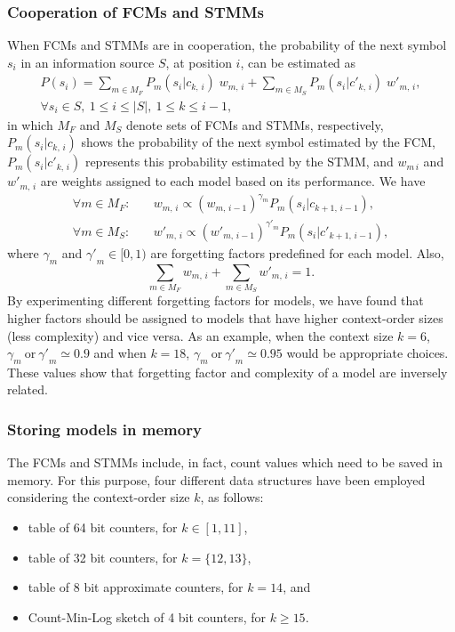 \documentclass[a4paper,num-refs]{oup-contemporary}
\begin{document}
 \subsubsection*{Cooperation of FCMs and STMMs} \label{sec.coop}
 When FCMs and STMMs are in cooperation, the probability of the next symbol $s_i$ in an information source $S$, at position $i$, can be estimated as
 \begin{multline} \label{eq.coop}
   P(s_i) = \sum_{m\in M_F} P_m(s_i|c_{k,\,i})\;w_{m,\,i} + \sum_{m\in M_S} P_m(s_i|{c'}_{k,\,i})\;{w'}_{m,\,i},\\
   \forall s_i\in S,~1\le i\le |S|,~1\le k\le i-1,
 \end{multline}
 in which $M_F$ and $M_S$ denote sets of FCMs and STMMs, respectively, $P_m(s_i|c_{k,\,i})$ shows the probability of the next symbol estimated by the FCM, $P_m(s_i|{c'}_{k,\,i})$ represents this probability estimated by the STMM, and $w_{m\,i}$ and ${w'}_{m,\,i}$ are weights assigned to each model based on its performance. We have
 \begin{align}
   \forall m\in M_F: \quad & w_{m,\,i} \propto (w_{m,\,i-1})^{\gamma_m} P_m(s_i|c_{k+1,\,i-1}),
   \nonumber
   \\[1mm]
   \forall m\in M_S: \quad & {w'}_{m,\,i} \propto ({w'}_{m,\,i-1})^{{\gamma'}_m} P_m(s_i|{c'}_{k+1,\,i-1}),
 \end{align}
 where $\gamma_m$ and ${\gamma'}_m \in [0,1)$ are forgetting factors predefined for each model. Also,
 \begin{equation}
   \sum_{m\in M_F} w_{m,\,i} + \sum_{m\in M_S} {w'}_{m,\,i} = 1.
 \end{equation}
 By experimenting different forgetting factors for models, we have found that higher factors should be assigned to models that have higher context-order sizes (less complexity) and vice versa. As an example, when the context size $k=6$, $\gamma_m~\mathrm{or}~{\gamma'}_m \simeq 0.9$ and when $k=18$, $\gamma_m~\mathrm{or}~{\gamma'}_m \simeq 0.95$ would be appropriate choices. These values show that forgetting factor and complexity of a model are inversely related.

 \subsubsection*{Storing models in memory}
 The FCMs and STMMs include, in fact, count values which need to be saved in memory. For this purpose, four different data structures have been employed considering the context-order size $k$, as follows:
 \begin{itemize}
   \item table of 64 bit counters, for $k \in [1, 11]$,
   \item table of 32 bit counters, for $k=\{12, 13\}$,
   \item table of 8 bit approximate counters, for $k=14$, and
   \item Count-Min-Log sketch of 4 bit counters, for $k \ge 15$.
 \end{itemize}
\end{document}
